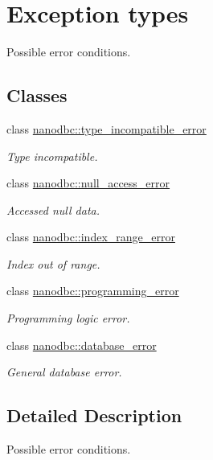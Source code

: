 \hypertarget{group__exceptions}{}\section{Exception types}
\label{group__exceptions}


Possible error conditions.  


\subsection*{Classes}
\begin{DoxyCompactItemize}
\item 
class \mbox{\hyperlink{classnanodbc_1_1type__incompatible__error}{nanodbc\+::type\+\_\+incompatible\+\_\+error}}
\begin{DoxyCompactList}\small\item\em Type incompatible. \end{DoxyCompactList}\item 
class \mbox{\hyperlink{classnanodbc_1_1null__access__error}{nanodbc\+::null\+\_\+access\+\_\+error}}
\begin{DoxyCompactList}\small\item\em Accessed null data. \end{DoxyCompactList}\item 
class \mbox{\hyperlink{classnanodbc_1_1index__range__error}{nanodbc\+::index\+\_\+range\+\_\+error}}
\begin{DoxyCompactList}\small\item\em Index out of range. \end{DoxyCompactList}\item 
class \mbox{\hyperlink{classnanodbc_1_1programming__error}{nanodbc\+::programming\+\_\+error}}
\begin{DoxyCompactList}\small\item\em Programming logic error. \end{DoxyCompactList}\item 
class \mbox{\hyperlink{classnanodbc_1_1database__error}{nanodbc\+::database\+\_\+error}}
\begin{DoxyCompactList}\small\item\em General database error. \end{DoxyCompactList}\end{DoxyCompactItemize}


\subsection{Detailed Description}
Possible error conditions. 

